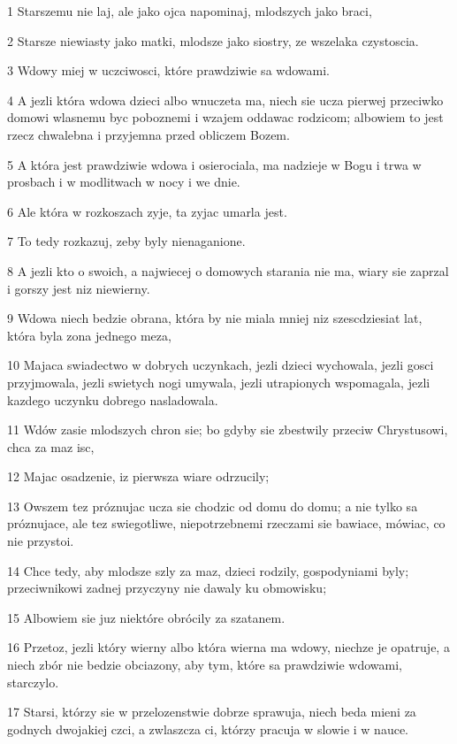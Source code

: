 \par 1 Starszemu nie laj, ale jako ojca napominaj, mlodszych jako braci,
\par 2 Starsze niewiasty jako matki, mlodsze jako siostry, ze wszelaka czystoscia.
\par 3 Wdowy miej w uczciwosci, które prawdziwie sa wdowami.
\par 4 A jezli która wdowa dzieci albo wnuczeta ma, niech sie ucza pierwej przeciwko domowi wlasnemu byc poboznemi i wzajem oddawac rodzicom; albowiem to jest rzecz chwalebna i przyjemna przed obliczem Bozem.
\par 5 A która jest prawdziwie wdowa i osierociala, ma nadzieje w Bogu i trwa w prosbach i w modlitwach w nocy i we dnie.
\par 6 Ale która w rozkoszach zyje, ta zyjac umarla jest.
\par 7 To tedy rozkazuj, zeby byly nienaganione.
\par 8 A jezli kto o swoich, a najwiecej o domowych starania nie ma, wiary sie zaprzal i gorszy jest niz niewierny.
\par 9 Wdowa niech bedzie obrana, która by nie miala mniej niz szescdziesiat lat, która byla zona jednego meza,
\par 10 Majaca swiadectwo w dobrych uczynkach, jezli dzieci wychowala, jezli gosci przyjmowala, jezli swietych nogi umywala, jezli utrapionych wspomagala, jezli kazdego uczynku dobrego nasladowala.
\par 11 Wdów zasie mlodszych chron sie; bo gdyby sie zbestwily przeciw Chrystusowi, chca za maz isc,
\par 12 Majac osadzenie, iz pierwsza wiare odrzucily;
\par 13 Owszem tez próznujac ucza sie chodzic od domu do domu; a nie tylko sa próznujace, ale tez swiegotliwe, niepotrzebnemi rzeczami sie bawiace, mówiac, co nie przystoi.
\par 14 Chce tedy, aby mlodsze szly za maz, dzieci rodzily, gospodyniami byly; przeciwnikowi zadnej przyczyny nie dawaly ku obmowisku;
\par 15 Albowiem sie juz niektóre obrócily za szatanem.
\par 16 Przetoz, jezli który wierny albo która wierna ma wdowy, niechze je opatruje, a niech zbór nie bedzie obciazony, aby tym, które sa prawdziwie wdowami, starczylo.
\par 17 Starsi, którzy sie w przelozenstwie dobrze sprawuja, niech beda mieni za godnych dwojakiej czci, a zwlaszcza ci, którzy pracuja w slowie i w nauce.
